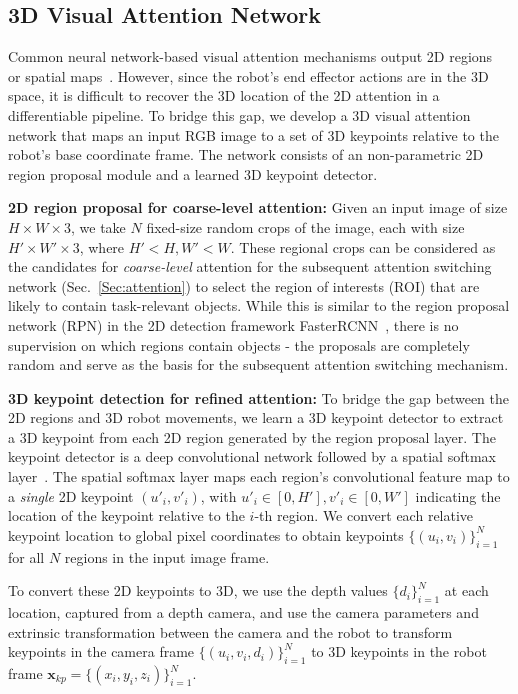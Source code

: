 \documentclass[letterpaper, 10 pt, conference]{ieeeconf}
\begin{document}
\subsection{3D Visual Attention Network}
\label{sec:3dattentionNet}
Common neural network-based visual attention mechanisms output 2D regions~\cite{mnih2014recurrent} or spatial maps~\cite{xu2015show}. However, since the robot's end effector actions are in the 3D space, it is difficult to recover the 3D location of the 2D attention in a differentiable pipeline.
To bridge this gap, we develop a 3D visual attention network that maps an input RGB image to a set of 3D keypoints relative to the robot's base coordinate frame. The network consists of an non-parametric 2D region proposal module and a learned 3D keypoint detector.

\textbf{2D region proposal for coarse-level attention:} Given an input image of size $H\times W \times 3$, we take $N$ fixed-size random crops of the image, each with size $H'\times W' \times 3$, where $H' < H, W' < W$. These regional crops can be considered as the candidates for \textit{coarse-level} attention for the subsequent attention switching network (Sec.~\ref{Sec:attention}) to select the region of interests (ROI) that are likely to contain task-relevant objects. While this is similar to the region proposal network (RPN) in the 2D detection framework FasterRCNN~\cite{ren2016faster}, there is no supervision on which regions contain objects - the proposals are completely random and serve as the basis for the subsequent attention switching mechanism.

\textbf{3D keypoint detection for refined attention:} To bridge the gap between the 2D regions and 3D robot movements, we learn a 3D keypoint detector to extract a 3D keypoint from each 2D region generated by the region proposal layer.
The keypoint detector is a deep convolutional network followed by a spatial softmax layer~\cite{finn2016deep}. 
The spatial softmax layer maps each region's convolutional feature map to a \textit{single} 2D keypoint $(u'_i, v'_i)$, with $u'_i \in [0, H'], v'_i \in [0, W']$ indicating the location of the keypoint relative to the $i$-th region. We convert each relative keypoint location to global pixel coordinates to obtain keypoints $\{(u_i, v_i)\}_{i=1}^N$ for all $N$ regions in the input image frame.

To convert these 2D keypoints to 3D, we use the depth values $\{d_i\}_{i=1}^N$ at each location, captured from a depth camera, and use the camera parameters and extrinsic transformation between the camera and the robot to transform keypoints in the camera frame $\{(u_i, v_i, d_i)\}_{i=1}^N$ to 3D keypoints in the robot frame $\mathbf{x}_{kp}=\{(x_i, y_i, z_i)\}_{i=1}^N$.
\end{document}

